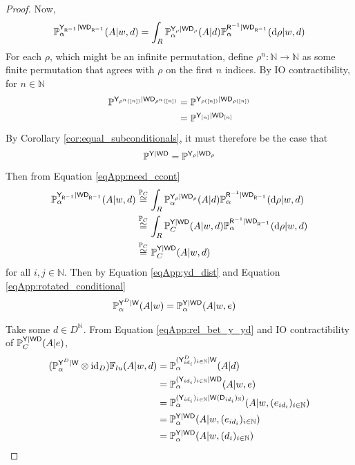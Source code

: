 \begin{proof}
Now,
\begin{align}
    \mathbb{P}^{\mathsf{Y}_{\mathsf{R}^{-1}}|\mathsf{W}\mathsf{D}_{\mathsf{R}^{-1}}}_\alpha(A|w,d) &= \int_R \mathbb{P}_\alpha^{\mathsf{Y}_\rho|\mathsf{W}\mathsf{D}_{\rho}}(A|d)\mathbb{P}_\alpha^{\mathsf{R}^{-1}|\mathsf{W}\mathsf{D}_{\mathsf{R}^{-1}}}(\mathrm{d}\rho|w,d)\label{eqApp:need_ccont}\\
\end{align}
For each $\rho$, which might be an infinite permutation, define $\rho^n:\mathbb{N}\to \mathbb{N}$ as some finite permutation that agrees with $\rho$ on the first $n$ indices. By IO contractibility, for $n\in \mathbb{N}$
\begin{align}
    \mathbb{P}^{\mathsf{Y}_{\rho^n([n])}|\mathsf{W}\mathsf{D}_{\rho^n([n])}} &= \mathbb{P}^{\mathsf{Y}_{\rho([n])}|\mathsf{W}\mathsf{D}_{\rho([n])}}\\
    &= \mathbb{P}^{\mathsf{Y}_{[n]}|\mathsf{W}\mathsf{D}_{[n]}}
\end{align}
By Corollary \ref{cor:equal_subconditionals}, it must therefore be the case that
\begin{align}
    \mathbb{P}^{\mathsf{Y}|\mathsf{W}\mathsf{D}} = \mathbb{P}^{\mathsf{Y}_{\rho}|\mathsf{W}\mathsf{D}_{\rho}}
\end{align}
Then from Equation \eqref{eqApp:need_ccont}
\begin{align}
    \mathbb{P}^{\mathsf{Y}_{\mathsf{R}^{-1}}|\mathsf{W}\mathsf{D}_{\mathsf{R}^{-1}}}_\alpha(A|w,d) &\overset{\mathbb{P}_C}{\cong} \int_R \mathbb{P}_\alpha^{\mathsf{Y}_\rho|\mathsf{W}\mathsf{D}_{\rho}}(A|d)\mathbb{P}_\alpha^{\mathsf{R}^{-1}|\mathsf{W}\mathsf{D}_{\mathsf{R}^{-1}}}(\mathrm{d}\rho|w,d)\\
    &\overset{\mathbb{P}_C}{\cong} \int_R \mathbb{P}_C^{\mathsf{Y}|\mathsf{WD}}(A|w,d)\mathbb{P}_\alpha^{\mathsf{R}^{-1}|\mathsf{W}\mathsf{D}_{\mathsf{R}^{-1}}}(\mathrm{d}\rho|w,d)\\
    &\overset{\mathbb{P}_C}{\cong} \mathbb{P}_C^{\mathsf{Y}|\mathsf{WD}}(A|w,d)\label{eqApp:rotated_conditional}
\end{align}
 for all $i,j\in \mathbb{N}$. Then by Equation \eqref{eqApp:yd_dist} and Equation \eqref{eqApp:rotated_conditional}
\begin{align}
    \mathbb{P}_\alpha^{\mathsf{Y}^D|\mathsf{W}}(A|w) &= \mathbb{P}_\alpha^{\mathsf{Y}|\mathsf{WD}}(A|w,e)\label{eqApp:rel_bet_y_yd}
\end{align}

Take some $d\in D^{\mathbb{N}}$. From Equation \eqref{eqApp:rel_bet_y_yd} and IO contractibility of $\mathbb{P}_C^{\mathsf{Y}|\mathsf{WD}}(A|e)$,
\begin{align}
    (\mathbb{P}_\alpha^{\mathsf{Y}^D|\mathsf{W}}\otimes \mathrm{id}_D)\mathbb{F}_{lu}(A|w,d) &= \mathbb{P}_\alpha^{(\mathsf{Y}^D_{i d_i})_{i\in \mathbb{N}}|\mathsf{W}}(A|d)\\
    &=\mathbb{P}_\alpha^{(\mathsf{Y}_{i d_i})_{i\in \mathbb{N}}|\mathsf{WD}}(A|w,e)\\
    &= \mathbb{P}_\alpha^{(\mathsf{Y}_{i d_i})_{i\in \mathbb{N}}|\mathsf{W}(\mathsf{D}_{i d_i})_{\mathbb{N}})}(A|w,(e_{i d_i})_{i\in \mathbb{N}})\\
    &= \mathbb{P}_\alpha^{\mathsf{Y}|\mathsf{WD}}(A|w,(e_{i d_i})_{i\in \mathbb{N}})\\
    &= \mathbb{P}_\alpha^{\mathsf{Y}|\mathsf{WD}}(A|w,(d_i)_{i\in\mathbb{N}})
\end{align}


\end{proof}
